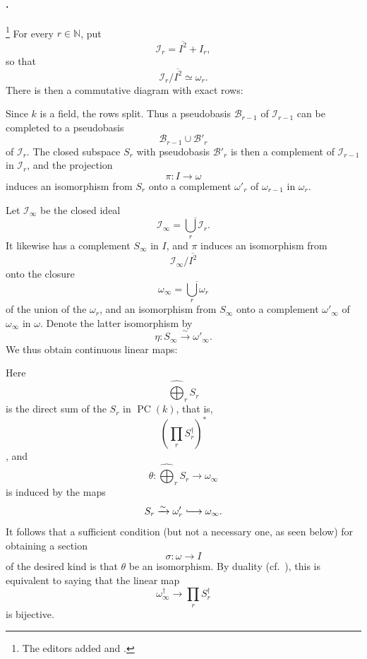 
\paragraph{.}
\label{sga3:VIIB:5.2.1.A}
\footnote{\label{sga3:VIIB:nde:155}The editors added
 and .}
For every \(r\in\mathbb N\), put
\[
  \mathcal I_r=\overline{I^2}+I_r,
\]
so that
\[
  \mathcal I_r/\overline{I^2}\simeq\omega_r.
\]
There is then a commutative diagram with exact rows:
\begin{center}
  \label{sga3:VIIB:5.2.1.A:exact-rows}
  
\end{center}

Since \(k\) is a field, the rows split. Thus a pseudobasis
\(\mathscr B_{r-1}\) of \(\mathcal I_{r-1}\) can be completed
to a pseudobasis
\[
  \mathscr B_{r-1}\cup\mathscr B'_r
\]
of \(\mathcal I_r\). The closed subspace \(S_r\) with
pseudobasis \(\mathscr B'_r\) is then a complement of
\(\mathcal I_{r-1}\) in \(\mathcal I_r\), and the projection
\[
  \pi:I\longrightarrow\omega
\]
induces an isomorphism from \(S_r\) onto a complement
\(\omega'_r\) of \(\omega_{r-1}\) in \(\omega_r\).

Let \(\mathcal I_\infty\) be the closed ideal
\[
  \mathcal I_\infty
  =
  \overline{\bigcup_r\mathcal I_r}.
\]
It likewise has a complement \(S_\infty\) in \(I\), and
\(\pi\) induces an isomorphism from
\[
  \mathcal I_\infty/\overline{I^2}
\]
onto the closure
\[
  \omega_\infty
  =
  \overline{\bigcup_r\omega_r}
\]
of the union of the \(\omega_r\), and an isomorphism from
\(S_\infty\) onto a complement \(\omega'_\infty\) of
\(\omega_\infty\) in \(\omega\). Denote the latter isomorphism by
\[
  \eta:S_\infty\xrightarrow{\sim}\omega'_\infty.
\]
We thus obtain continuous linear maps:
\begin{center}
  \label{sga3:VIIB:5.2.1.A:splitting-maps}
  
\end{center}

Here
\[
  \widehat{\bigoplus}_r S_r
\]
is the direct sum of the \(S_r\) in \(\operatorname{PC}(k)\),
that is,
\[
  \left(\prod_r S_r^\dagger\right)^*
\]
, and
\[
  \theta:
  \widehat{\bigoplus}_r S_r
  \longrightarrow\omega_\infty
\]
is induced by the maps
\[
  S_r\xrightarrow{\sim}\omega'_r
  \lhook\joinrel\longrightarrow\omega_\infty.
\]
It follows that a sufficient condition \textup{(but not a
necessary one, as seen below)} for obtaining a section
\[
  \sigma:\omega\longrightarrow I
\]
of the desired kind is that \(\theta\) be an isomorphism.
By duality \textup{(cf.\ )}, this is equivalent to saying
that the linear map
\[
  \omega_\infty^\dagger
  \longrightarrow
  \prod_r S_r^\dagger
\]
is bijective.
